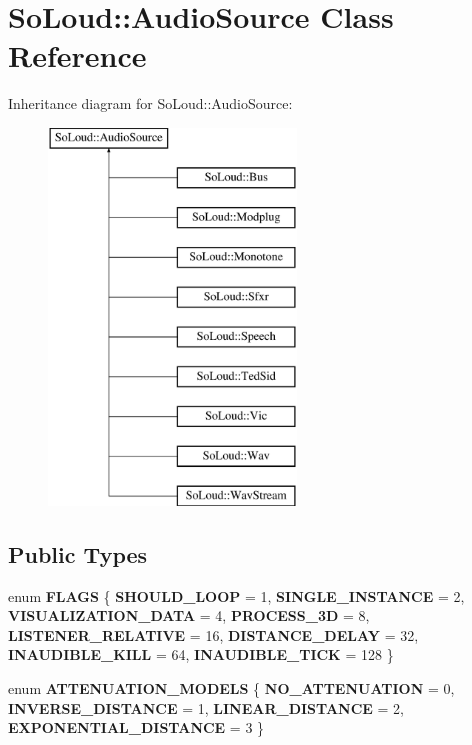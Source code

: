 \hypertarget{class_so_loud_1_1_audio_source}{}\section{So\+Loud\+:\+:Audio\+Source Class Reference}
\label{class_so_loud_1_1_audio_source}
Inheritance diagram for So\+Loud\+:\+:Audio\+Source\+:\begin{figure}[H]
\begin{center}
\leavevmode
\includegraphics[height=10.000000cm]{class_so_loud_1_1_audio_source}
\end{center}
\end{figure}
\subsection*{Public Types}
\begin{DoxyCompactItemize}
\item 
\mbox{\label{class_so_loud_1_1_audio_source_a0c2eb0c2736920eafe2f178a15a5ee3b}} 
enum {\bfseries F\+L\+A\+GS} \{ \newline
{\bfseries S\+H\+O\+U\+L\+D\+\_\+\+L\+O\+OP} = 1, 
{\bfseries S\+I\+N\+G\+L\+E\+\_\+\+I\+N\+S\+T\+A\+N\+CE} = 2, 
{\bfseries V\+I\+S\+U\+A\+L\+I\+Z\+A\+T\+I\+O\+N\+\_\+\+D\+A\+TA} = 4, 
{\bfseries P\+R\+O\+C\+E\+S\+S\+\_\+3D} = 8, 
\newline
{\bfseries L\+I\+S\+T\+E\+N\+E\+R\+\_\+\+R\+E\+L\+A\+T\+I\+VE} = 16, 
{\bfseries D\+I\+S\+T\+A\+N\+C\+E\+\_\+\+D\+E\+L\+AY} = 32, 
{\bfseries I\+N\+A\+U\+D\+I\+B\+L\+E\+\_\+\+K\+I\+LL} = 64, 
{\bfseries I\+N\+A\+U\+D\+I\+B\+L\+E\+\_\+\+T\+I\+CK} = 128
 \}
\item 
\mbox{\label{class_so_loud_1_1_audio_source_a8ded5e82ef73b03400178f7cb591b9fb}} 
enum {\bfseries A\+T\+T\+E\+N\+U\+A\+T\+I\+O\+N\+\_\+\+M\+O\+D\+E\+LS} \{ {\bfseries N\+O\+\_\+\+A\+T\+T\+E\+N\+U\+A\+T\+I\+ON} = 0, 
{\bfseries I\+N\+V\+E\+R\+S\+E\+\_\+\+D\+I\+S\+T\+A\+N\+CE} = 1, 
{\bfseries L\+I\+N\+E\+A\+R\+\_\+\+D\+I\+S\+T\+A\+N\+CE} = 2, 
{\bfseries E\+X\+P\+O\+N\+E\+N\+T\+I\+A\+L\+\_\+\+D\+I\+S\+T\+A\+N\+CE} = 3
 \}
\end{DoxyCompactItemize}
